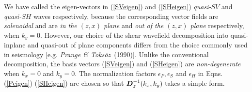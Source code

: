We have called the eigen-vectors in (\ref{SVeigen}) and (\ref{SHeigen}) 
{\em quasi-\/}$SV$ and {\em quasi-\/}$SH$ waves respectively, because the 
corresponding vector fields are {\em solenoidal\/} and are {\em in the 
$(z,x)$ plane\/} 
and {\em out of the $(z,x)$ plane\/} respectively, when $k_{y}=0$. However, our 
choice of the  shear wavefield decomposition into quasi-inplane and quasi-out 
of plane components
differs from the choice commonly used in seismology [e.g. 
{\em Prange \& Toks\"oz}~(1990)]. Unlike the conventional decomposition,  the basis vectors 
(\ref{SVeigen}) and (\ref{SHeigen}) are {\em non-degenerate\/} when 
${k}_{x}=0$ and ${k}_{y}=0$.
The normalization factors ${\epsilon}_{P},{\epsilon}_{S} $ and 
${\epsilon}_{H}$
in Eqns.(\ref{Peigen})-(\ref{SHeigen}) are chosen so that ${\mbox{\boldmath$\mit D$\unboldmath}}_{z}^{-1}({k}_{x},{k}_{y})$ 
takes a simple form.


